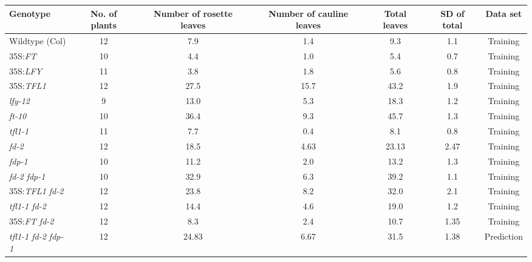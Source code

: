 \begin{table*}[!htb]
\centering
\setlength{\tabcolsep}{3pt}
\begin{tabular}{@{}l@{\hspace{-1em}}cccccc@{}}
  \toprule%
  Genotype & No. of plants & \parbox[c]{6em}{\centering Number of \\ \vspace{-0.7ex}rosette leaves\vphantom{$k_j$} } & \parbox[c]{6em}{\centering Number of \\\vspace{-0.7ex}cauline leaves\vphantom{$k_j$}} & Total leaves & SD of total & Data set \\
      \toprule%
      Wildtype (Col)               & 12 & 7.9   & 1.4   & 9.3   & 1.1  & Training\\
      35S:\emph{FT}                & 10 & 4.4   & 1.0   & 5.4   & 0.7  & Training\\ 
      35S:\emph{LFY}               & 11 & 3.8   & 1.8   & 5.6   & 0.8  & Training\\
      35S:\emph{TFL1}              & 12 & 27.5  & 15.7  & 43.2  & 1.9  & Training\\
      \emph{lfy-12}                & 9  & 13.0  & 5.3   & 18.3  & 1.2  & Training\\
      \emph{ft-10}                 & 10 & 36.4  & 9.3   & 45.7  & 1.3  & Training\\
      \emph{tfl1-1}                & 11 & 7.7   & 0.4   & 8.1   & 0.8  & Training\\
      \emph{fd-2}                  & 12 & 18.5  & 4.63  & 23.13 & 2.47 & Training\\
      \emph{fdp-1}                 & 10 & 11.2  & 2.0   & 13.2  & 1.3  & Training\\
      \emph{fd-2 fdp-1}            & 10 & 32.9  & 6.3   & 39.2  & 1.1  & Training \\
      35S:\emph{TFL1 fd-2}         & 12 & 23.8  & 8.2   & 32.0  & 2.1  & Training \\
      \emph{tfl1-1 fd-2}           & 12 & 14.4  & 4.6   & 19.0  & 1.2  & Training \\
      35S:\emph{FT fd-2}           & 12 & 8.3   & 2.4   & 10.7  & 1.35 & Training \\
      \emph{tfl1-1 fd-2 fdp-1}     & 12 & 24.83 & 6.67  & 31.5  & 1.38 & Prediction \\

\end{tabular}
\end{table*}
